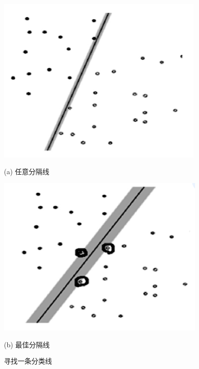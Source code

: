 \documentclass[12pt,a4paper]{article}%
\begin{document}
	\begin{figure}[htbp]
		\begin{minipage}[t]{0.5\linewidth}
			\centering
			\includegraphics[width=\textwidth]{figure5}
			\centerline{\fontsize{10pt}{15pt}(a) 任意分隔线}
		\end{minipage}%
		\begin{minipage}[t]{0.5\linewidth}
			\centering
			\includegraphics[width=\textwidth]{figure6}
			\centerline{\fontsize{10pt}{15pt}(b) 最佳分隔线}
		\end{minipage}
		\caption{\fontsize{10pt}{15pt}寻找一条分类线}
	\end{figure}
\end{document}
